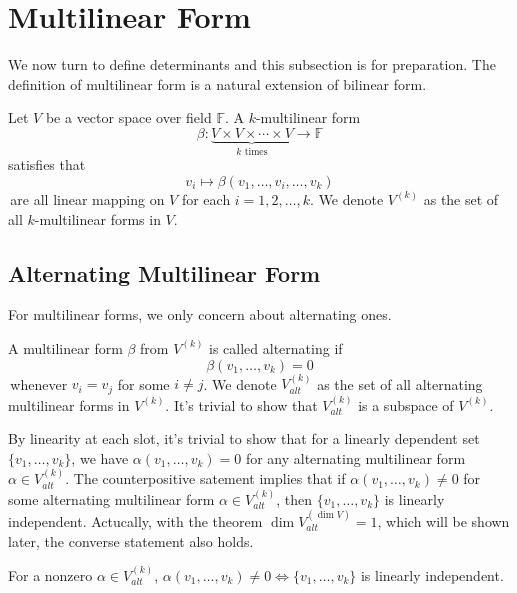 \section{Multilinear Form}
We now turn to define determinants and this subsection is for preparation. The definition of multilinear form is a natural extension of bilinear form.

\begin{definition}
    Let $V$ be a vector space over field $\mathbb{F}$. A $k$-multilinear form $$\beta: \underbrace{V\times V \times \cdots \times V}_{k\text{ times}} \to \mathbb{F}$$ satisfies that 
    $$v_i \mapsto \beta(v_1, \ldots, v_i, \ldots, v_k)$$
    \,are all linear mapping on $V$ for each $i = 1, 2, \ldots, k$. We denote $V^{(k)}$ as the set of all $k$-multilinear forms in $V$.
\end{definition}

\subsection{Alternating Multilinear Form}
For multilinear forms, we only concern about alternating ones.
\begin{definition}
    A multilinear form $\beta$ from $V^{(k)}$ is called alternating if 
    $$\beta(v_1, \ldots, v_k) = 0$$
    \,whenever $v_i = v_j$ for some $i \neq j$. We denote $V_{alt}^{(k)}$ as the set of all alternating multilinear forms in $V^{(k)}$. It's trivial to show that $V_{alt}^{(k)}$ is a subspace of $V^{(k)}$.
\end{definition}

By linearity at each slot, it's trivial to show that for a linearly dependent set $\{v_1, \ldots, v_k\}$, we have $\alpha(v_1, \ldots, v_k) = 0$ for any alternating multilinear form $\alpha \in V_{alt}^{(k)}$.
The counterpositive satement implies that if $\alpha(v_1, \ldots, v_k) \neq 0$ for some alternating multilinear form $\alpha \in V_{alt}^{(k)}$, then $\{v_1, \ldots, v_k\}$ is linearly independent. Actucally, with the theorem $\operatorname{dim} V^{(\operatorname{dim} V)}_{alt}=1$, which will be shown later, the converse statement also holds.
\begin{theorem}
    For a nonzero $\alpha \in V_{alt}^{(k)} $, $\alpha(v_1, \ldots, v_k) \neq 0 \iff \{v_1, \ldots, v_k\}$ is linearly independent.
\end{theorem}

